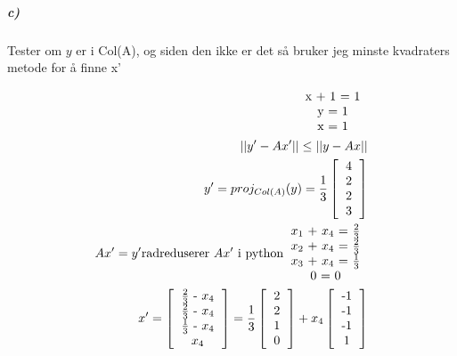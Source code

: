 \documentclass[11pt, A4paper,norsk]{article}
\begin{document}
			\subparagraph{c)}
				\begin{flushleft}
Tester om $y$ er i Col(A), og siden den ikke er det så bruker jeg minste kvadraters metode for å finne x'
				\end{flushleft}
				\begin{align}
\begin{tabular} { c }
x + 1 = 1 \\
y = 1 \\
x = 1 \\
\end{tabular} \\
||y' - Ax'|| \leq ||y - Ax|| \\
y' = proj_{Col(A)}(y) = \frac{1}{3}
\left[
\begin{tabular} { c }
4 \\
2 \\
2 \\
3
\end{tabular}
\right] \\
Ax' = y'
\text{radreduserer $Ax'$ i python}
\begin{tabular} { c }
$x_1$ + $x_4$ = $\frac{2}{3}$ \\
$x_2$ + $x_4$ = $\frac{2}{3}$ \\
$x_3$ + $x_4$ = $\frac{1}{3}$ \\
0 = 0
\end{tabular} \\
x' = 
\left[
\begin{tabular} { c }
$\frac{2}{3}$ - $x_4$ \\
$\frac{2}{3}$ - $x_4$ \\
$\frac{1}{3}$ - $x_4$ \\
$x_4$
\end{tabular}
\right] = \frac{1}{3}
\left[
\begin{tabular} { c }
2 \\
2 \\
1 \\
0
\end{tabular}
\right]
+ x_4
\left[
\begin{tabular} { c }
-1 \\
-1 \\
-1 \\
1
\end{tabular}
\right]
				\end{align}
			
\end{document}
